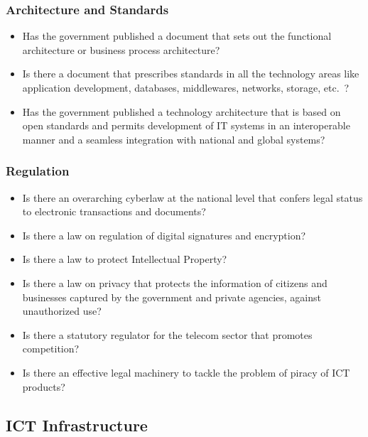 \subsubsection*{Architecture and Standards}
\begin{itemize}
	\item Has the government published a document that sets out the functional architecture or business process architecture?
	\item Is there a document that prescribes standards in all the technology areas like application development, databases, middlewares, networks, storage, etc.\ ?
	\item Has the government published a technology architecture that is based on open standards and permits development of IT systems in an interoperable manner and a seamless integration with national and global systems?
\end{itemize}



\subsubsection*{Regulation}
\begin{itemize}
	\item Is there an overarching cyberlaw at the national level that confers legal status to electronic transactions and documents?
	\item Is there a law on regulation of digital signatures and encryption?
	\item Is there a law to protect Intellectual Property?
	\item Is there a law on privacy that protects the information of citizens and businesses captured by the government and private agencies, against unauthorized use? 
	\item Is there a statutory regulator for the telecom sector that promotes competition?
	\item Is there an effective legal machinery to tackle the problem of piracy of ICT products?
\end{itemize}

\subsection{ICT Infrastructure}
